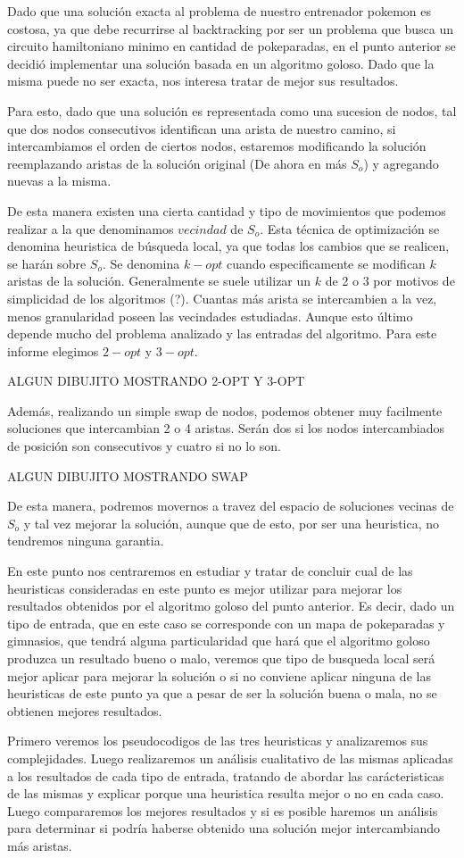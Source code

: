 Dado que una solución exacta al problema de nuestro entrenador pokemon es costosa, ya que debe recurrirse al backtracking por ser un problema que busca un circuito hamiltoniano minimo en cantidad de pokeparadas, en el punto anterior se decidió implementar una solución basada en un algoritmo goloso. Dado que la misma puede no ser exacta, nos interesa tratar de mejor sus resultados. 

Para esto, dado que una solución es representada como una sucesion de nodos, tal que dos nodos consecutivos identifican una arista de nuestro camino, si intercambiamos el orden de ciertos nodos, estaremos modificando la solución reemplazando aristas de la solución original (De ahora en más $S_o$) y agregando nuevas a la misma. 

De esta manera existen una cierta cantidad y tipo de movimientos que podemos realizar a la que denominamos $vecindad$ de $S_o$. Esta técnica de optimización se denomina heuristica de búsqueda local, ya que todas los cambios que se realicen, se harán sobre $S_o$. 
Se denomina $k-opt$ cuando especificamente se modifican $k$ aristas de la solución. Generalmente se suele utilizar un $k$ de 2 o 3 por motivos de simplicidad de los algoritmos (?). Cuantas más arista se intercambien a la vez, menos granularidad poseen las vecindades estudiadas. Aunque esto último depende mucho del problema analizado y las entradas del algoritmo. Para este informe elegimos $2-opt$ y $3-opt$.

ALGUN DIBUJITO MOSTRANDO 2-OPT Y 3-OPT 

Además, realizando un simple swap de nodos, podemos obtener muy facilmente soluciones que intercambian 2 o 4 aristas. Serán dos si los nodos intercambiados de posición son consecutivos y cuatro si no lo son.

ALGUN DIBUJITO MOSTRANDO SWAP
 
De esta manera, podremos movernos a travez del espacio de soluciones vecinas de $S_o$ y tal vez mejorar la solución, aunque que de esto, por ser una heuristica, no tendremos ninguna garantia.

En este punto nos centraremos en estudiar y tratar de concluir cual de las heuristicas consideradas en este punto es mejor utilizar para mejorar los resultados obtenidos por el algoritmo goloso del punto anterior. Es decir, dado un tipo de entrada, que en este caso se corresponde con un mapa de pokeparadas y gimnasios, que tendrá alguna particularidad que hará que el algoritmo goloso produzca un resultado bueno o malo, veremos que tipo de busqueda local será mejor aplicar para mejorar la solución o si no conviene aplicar ninguna de las heuristicas de este punto ya que a pesar de ser la solución buena o mala, no se obtienen mejores resultados.

Primero veremos los pseudocodigos de las tres heuristicas y analizaremos sus complejidades. Luego realizaremos un análisis cualitativo de las mismas aplicadas a los resultados de cada tipo de entrada, tratando de abordar las carácteristicas de las mismas y explicar porque una heuristica resulta mejor o no en cada caso. Luego compararemos los mejores resultados y si es posible haremos un análisis para determinar si podría haberse obtenido una solución mejor intercambiando más aristas.
